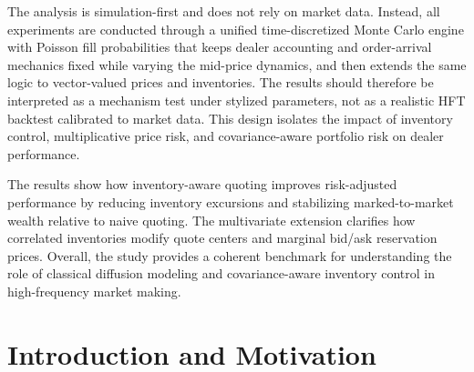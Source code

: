 \documentclass[a4paper,10pt,titlepage,oneside,openany]{book}
\theoremstyle{plain}\newtheorem{theorem}{Theorem}[chapter]
\theoremstyle{definition}\newtheorem{definition}{Definition}[chapter]
\theoremstyle{remark}\newtheorem{remark}{Remark}[chapter]
\newenvironment{tightabstract}[1][0.88]{%
  \begin{center}
  \begin{tcolorbox}[title={Abstract}, width=#1\textwidth, left=5mm, right=5mm,
    colback=white, boxrule=0.4pt]
  \small\justifying
}{%
  \end{tcolorbox}
  \end{center}
}
\begin{document}
\begin{titlepage}
\begin{center}
\begin{tightabstract}
The analysis is simulation-first and does not rely on market data. Instead, all experiments are conducted through a unified time-discretized Monte Carlo engine with Poisson fill probabilities that keeps dealer accounting and order-arrival mechanics fixed while varying the mid-price dynamics, and then extends the same logic to vector-valued prices and inventories. The results should therefore be interpreted as a mechanism test under stylized parameters, not as a realistic HFT backtest calibrated to market data. This design isolates the impact of inventory control, multiplicative price risk, and covariance-aware portfolio risk on dealer performance.

The results show how inventory-aware quoting improves risk-adjusted performance by reducing inventory excursions and stabilizing marked-to-market wealth relative to naive quoting. The multivariate extension clarifies how correlated inventories modify quote centers and marginal bid/ask reservation prices. Overall, the study provides a coherent benchmark for understanding the role of classical diffusion modeling and covariance-aware inventory control in high-frequency market making.
\end{tightabstract}
\end{center}
\end{titlepage}

\frontmatter
\clearpage
{}
\setcounter{page}{1} %
\tableofcontents
\thispagestyle{plain}

\mainmatter
\clearpage
\setcounter{page}{1}


\chapter*{Introduction and Motivation}
\end{document}
